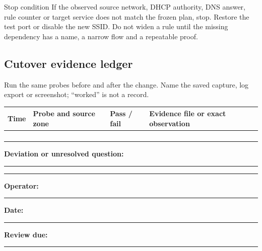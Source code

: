 \medskip
\begin{telospanel}{Stop condition}
If the observed source network, DHCP authority, DNS answer, rule counter or
target service does not match the frozen plan, stop.  Restore the test port or
disable the new SSID.  Do not widen a rule until the missing dependency has a
name, a narrow flow and a repeatable proof.
\end{telospanel}

\subsection*{Cutover evidence ledger}
Run the same probes before and after the change.  Name the saved capture, log
export or screenshot; ``worked'' is not a record.

\begingroup
\small
\renewcommand{\arraystretch}{1.55}
\begin{tabularx}{\linewidth}{@{}p{.14\linewidth}p{.25\linewidth}p{.16\linewidth}L@{}}
\toprule
\textbf{Time} & \textbf{Probe and source zone} & \textbf{Pass / fail} &
\textbf{Evidence file or exact observation}\\
\midrule
\rule{0pt}{2.1em} & & & \\\cmidrule(lr){1-4}
\rule{0pt}{2.1em} & & & \\\cmidrule(lr){1-4}
\rule{0pt}{2.1em} & & & \\\cmidrule(lr){1-4}
\rule{0pt}{2.1em} & & & \\
\bottomrule
\end{tabularx}
\endgroup

\medskip
\noindent\textbf{Deviation or unresolved question:}\par
\vspace{1.4em}\hrule
\vspace{1.4em}\hrule

\medskip
\noindent
\textbf{Operator:} \rule{.22\linewidth}{.4pt}\hfill
\textbf{Date:} \rule{.17\linewidth}{.4pt}\hfill
\textbf{Review due:} \rule{.17\linewidth}{.4pt}


